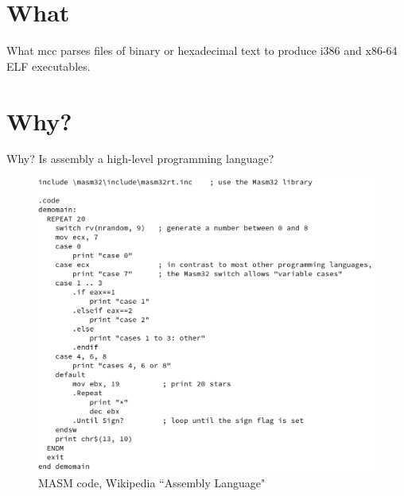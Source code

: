 \documentclass{beamer}
\begin{document}
\section{What}

\begin{frame}{What}
	mcc parses files of binary or hexadecimal text to produce i386 and
	x86-64 ELF executables.
\end{frame}

\section{Why?}

\begin{frame}{Why?}
	Is assembly a high-level programming language?

	\begin{figure}
		\includegraphics[width=0.6\linewidth]{masm.png}
		\caption{MASM code, Wikipedia ``Assembly Language"}
	\end{figure}
\end{frame}
\end{document}
